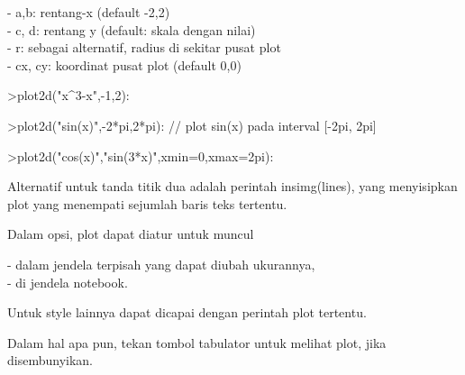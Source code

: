 \documentclass{article}
\begin{document}
\begin{eulernotebook}
\begin{eulercomment}
\begin{eulercomment}
\begin{eulercomment}
\begin{eulercomment}
\begin{eulercomment}
- a,b: rentang-x (default -2,2)\\
- c, d: rentang y (default: skala dengan nilai)\\
- r: sebagai alternatif, radius di sekitar pusat plot\\
- cx, cy: koordinat pusat plot (default 0,0)
\end{eulercomment}
\begin{eulerprompt}
>plot2d("x^3-x",-1,2):
\end{eulerprompt}
\begin{eulerprompt}
>plot2d("sin(x)",-2*pi,2*pi): // plot sin(x) pada interval [-2pi, 2pi]
\end{eulerprompt}
\begin{eulerprompt}
>plot2d("cos(x)","sin(3*x)",xmin=0,xmax=2pi):
\end{eulerprompt}
\begin{eulercomment}
Alternatif untuk tanda titik dua adalah perintah insimg(lines), yang
menyisipkan plot yang menempati sejumlah baris teks tertentu.

Dalam opsi, plot dapat diatur untuk muncul

- dalam jendela terpisah yang dapat diubah ukurannya,\\
- di jendela notebook.

Untuk style lainnya dapat dicapai dengan perintah plot tertentu.

Dalam hal apa pun, tekan tombol tabulator untuk melihat plot, jika
disembunyikan.


\end{eulercomment}
\end{eulercomment}
\end{eulercomment}
\end{eulercomment}
\end{eulercomment}
\end{eulernotebook}
\end{document}
